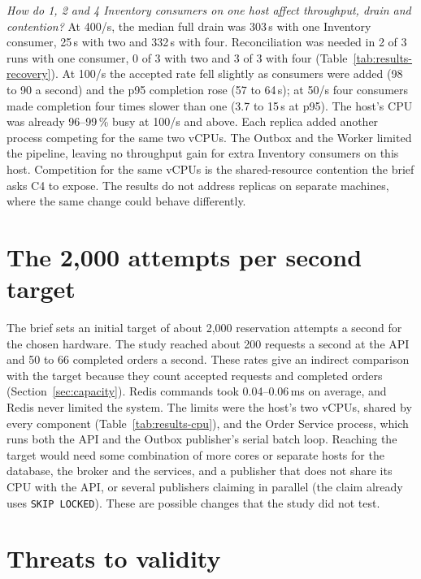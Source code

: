 \documentclass[a4paper]{report}
\begin{document}
\emph{How do 1, 2 and 4 Inventory consumers on one host affect throughput,
drain and contention?} At 400/s, the median full drain was 303\,s with one
Inventory consumer, 25\,s with two and 332\,s with four. Reconciliation was
needed in 2 of 3 runs with one consumer, 0 of 3 with two and 3 of 3 with
four (Table~\ref{tab:results-recovery}). At 100/s the accepted rate fell
slightly as consumers were added (98 to 90 a second) and
the p95 completion rose (57 to 64\,s); at 50/s four consumers made completion
four times slower than one (3.7 to 15\,s at p95). The host's CPU was already
96--99\,\% busy at 100/s and above. Each replica added another process
competing for the same two vCPUs. The Outbox and the Worker limited the
pipeline, leaving no throughput gain for extra Inventory consumers on this
host. Competition for the same vCPUs is the shared-resource contention the
brief asks C4 to expose. The results do not address replicas on separate
machines, where the same change could behave differently.

\section{The 2,000 attempts per second target}

The brief sets an initial target of about 2,000 reservation attempts a second
for the chosen hardware. The study reached about 200 requests a second at
the API and 50 to 66 completed orders a second. These rates give an indirect
comparison with the target because they count accepted requests and
completed orders (Section~\ref{sec:capacity}). Redis commands took
0.04--0.06\,ms on average, and Redis never limited the system. The limits were
the host's two vCPUs, shared by every component
(Table~\ref{tab:results-cpu}), and the Order Service process, which runs both
the API and the Outbox publisher's serial batch loop. Reaching the target would
need some combination of more cores or separate hosts for the database, the
broker and the services, and a publisher that does not share its CPU with the
API, or several publishers claiming in parallel (the claim already uses
\texttt{SKIP LOCKED}). These are possible changes that the study did not test.

\section{Threats to validity}
\end{document}
